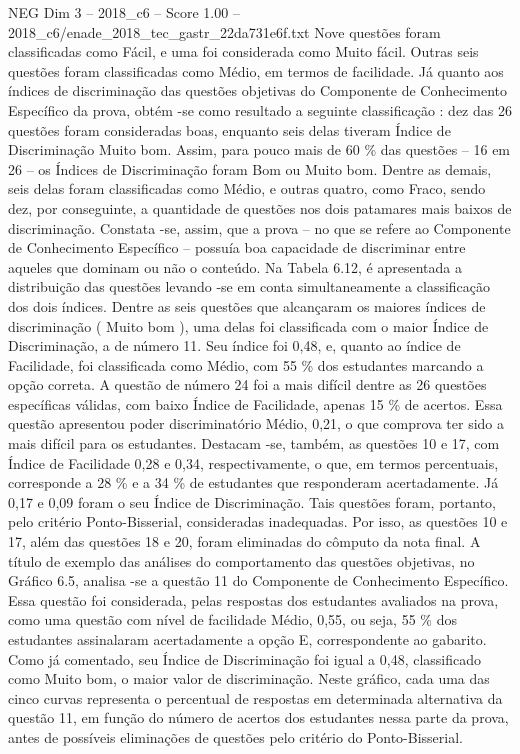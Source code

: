 \begin{textsample}{NEG Dim 3 – 2018\_c6 – Score 1.00 – 2018\_c6/enade\_2018\_tec\_gastr\_22da731e6f.txt}
Nove questões foram classificadas como Fácil, e uma foi considerada como Muito fácil.
Outras seis questões foram classificadas como Médio, em termos de facilidade.
Já quanto aos índices de discriminação das questões objetivas do Componente de Conhecimento Específico da prova, obtém -se como resultado a seguinte classificação : dez das 26 questões foram consideradas boas, enquanto seis delas tiveram Índice de Discriminação Muito bom.
Assim, para pouco mais de 60 \% das questões – 16 em 26 – os Índices de Discriminação foram Bom ou Muito bom.
Dentre as demais, seis delas foram classificadas como Médio, e outras quatro, como Fraco, sendo dez, por conseguinte, a quantidade de questões nos dois patamares mais baixos de discriminação.
Constata -se, assim, que a prova – no que se refere ao Componente de Conhecimento Específico – possuía boa capacidade de discriminar entre aqueles que dominam ou não o conteúdo.
Na Tabela 6.12, é apresentada a distribuição das questões levando -se em conta simultaneamente a classificação dos dois índices.
Dentre as seis questões que alcançaram os maiores índices de discriminação ( Muito bom ), uma delas foi classificada com o maior Índice de Discriminação, a de número 11.
Seu índice foi 0,48, e, quanto ao índice de Facilidade, foi classificada como Médio, com 55 \% dos estudantes marcando a opção correta.
A questão de número 24 foi a mais difícil dentre as 26 questões específicas válidas, com baixo Índice de Facilidade, apenas 15 \% de acertos.
Essa questão apresentou poder discriminatório Médio, 0,21, o que comprova ter sido a mais difícil para os estudantes.
Destacam -se, também, as questões 10 e 17, com Índice de Facilidade 0,28 e 0,34, respectivamente, o que, em termos percentuais, corresponde a 28 \% e a 34 \% de estudantes que responderam acertadamente.
Já 0,17 e 0,09 foram o seu Índice de Discriminação.
Tais questões foram, portanto, pelo critério Ponto-Bisserial, consideradas inadequadas.
Por isso, as questões 10 e 17, além das questões 18 e 20, foram eliminadas do cômputo da nota final.
A título de exemplo das análises do comportamento das questões objetivas, no Gráfico 6.5, analisa -se a questão 11 do Componente de Conhecimento Específico.
Essa questão foi considerada, pelas respostas dos estudantes avaliados na prova, como uma questão com nível de facilidade Médio, 0,55, ou seja, 55 \% dos estudantes assinalaram acertadamente a opção E, correspondente ao gabarito.
Como já comentado, seu Índice de Discriminação foi igual a 0,48, classificado como Muito bom, o maior valor de discriminação.
Neste gráfico, cada uma das cinco curvas representa o percentual de respostas em determinada alternativa da questão 11, em função do número de acertos dos estudantes nessa parte da prova, antes de possíveis eliminações de questões pelo critério do Ponto-Bisserial.

\end{textsample}
